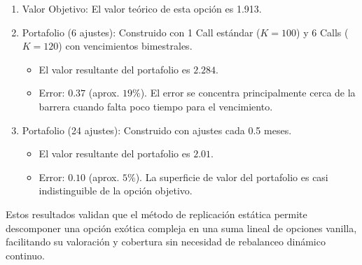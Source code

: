 \begin{enumerate} 
  \item Valor Objetivo: El valor teórico de esta opción es 1.913. 
  
  \item Portafolio (6 ajustes): Construido con 1 Call estándar ($K=100$) y 6 Calls ($K=120$) con vencimientos bimestrales. 
    \begin{itemize} 
      \item El valor resultante del portafolio es $2.284$.

      \item Error: $0.37$ (aprox. $19\%$). El error se concentra principalmente cerca de la barrera cuando falta poco tiempo para el vencimiento. 
    \end{itemize} 
    
  \item Portafolio (24 ajustes): Construido con ajustes cada 0.5 meses. 
    \begin{itemize} 
      \item El valor resultante del portafolio es $2.01$. 
      
      \item Error: $0.10$ (aprox. $5\%$). La superficie de valor del portafolio es casi indistinguible de la opción objetivo. 
    \end{itemize} 
\end{enumerate}

Estos resultados validan que el método de replicación estática permite descomponer una opción exótica compleja en una suma lineal de opciones vanilla, facilitando su valoración y cobertura sin necesidad de rebalanceo dinámico continuo.
